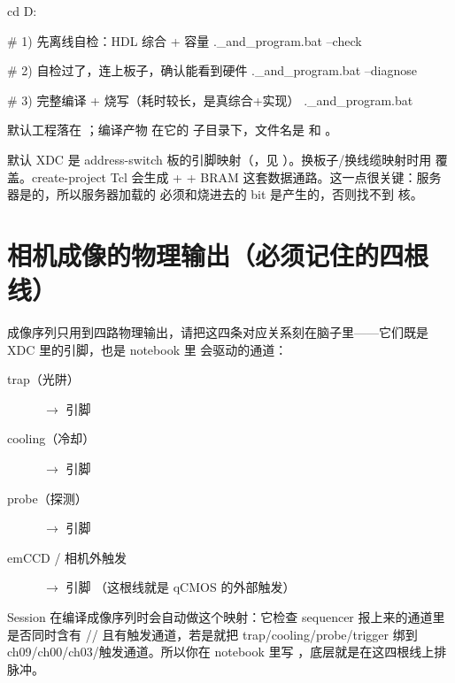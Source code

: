 \documentclass[11pt,oneside,openany]{book}
\begin{document}
\begin{codeblock}[PowerShell]
cd D:\ZLC

# 1) 先离线自检：HDL 综合 + 容量
.\fpga\build_and_program.bat --check

# 2) 自检过了，连上板子，确认能看到硬件
.\fpga\build_and_program.bat --diagnose

# 3) 完整编译 + 烧写（耗时较长，是真综合+实现）
.\fpga\build_and_program.bat
\end{codeblock}

默认工程落在 ；编译产物 在它的  子目录下，文件名是  和 。

\begin{notebox}
默认 XDC 是 address-switch 板的引脚映射（，见 ）。换板子/换线缆映射时用  覆盖。create-project Tcl 会生成  +  + BRAM 这套数据通路。这一点很关键：服务器是的，所以服务器加载的  必须和烧进去的 bit 是产生的，否则找不到  核。
\end{notebox}

\section{相机成像的物理输出（必须记住的四根线）}

成像序列只用到四路物理输出，请把这四条对应关系刻在脑子里——它们既是 XDC 里的引脚，也是 notebook 里  会驱动的通道：

\begin{description}
\item[trap（光阱）]  $\rightarrow$ 引脚 
\item[cooling（冷却）]  $\rightarrow$ 引脚 
\item[probe（探测）]  $\rightarrow$ 引脚 
\item[emCCD / 相机外触发]  $\rightarrow$ 引脚 （这根线就是 qCMOS 的外部触发）
\end{description}

Session 在编译成像序列时会自动做这个映射：它检查 sequencer 报上来的通道里是否同时含有 // 且有触发通道，若是就把 trap/cooling/probe/trigger 绑到 ch09/ch00/ch03/触发通道。所以你在 notebook 里写 ，底层就是在这四根线上排脉冲。
\end{document}
